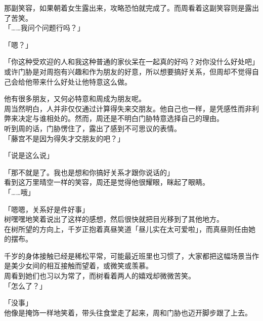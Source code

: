 那副笑容，如果朝着女生露出来，攻略恐怕就完成了。而周看着这副笑容则是露出了苦笑。\\

「……我问个问题行吗？」

「嗯？」

「你这种受欢迎的人和我这种普通的家伙呆在一起真的好吗？对你没什么好处吧」\\

或许门胁是对周抱有兴趣和作为朋友的好意，所以想要搞好关系，但周却不觉得自己会给他带来什么好处让他特意这么做。

他有很多朋友，又何必特意和周成为朋友呢。\\

周当然明白，人并非仅仅通过计算得失来交朋友。他自己也一样，是凭感性而非利弊来决定与谁相处的。然而，周还是不明白门胁特意选择自己的理由。\\

听到周的话，门胁愣住了，露出了感到不可思议的表情。\\

「藤宫不是因为得失才交朋友的吧？」

「说是这么说」

「那不就是了。我也是想和你搞好关系才跟你说话的」\\

看到这万里晴空一样的笑容，周还是觉得他很耀眼，眯起了眼睛。\\

「……哦」

「嗯嗯，关系好是件好事」\\

树嘿嘿地笑着说出了这样的感想，然后很快就把目光移到了其他地方。\\

在树所望的方向上，千岁正抱着真昼笑道「昼儿实在太可爱啦」，而真昼则任由她的摆布。

千岁的身体接触已经是稀松平常，可能最近班里也习惯了，大家都把这幅场景当作是美少女间的相互接触而望着，或微笑或羡慕。\\

周看到她们也习以为常了，而树看着两人的嬉戏却微微苦笑。\\

「怎么了？」

「没事」\\

他像是掩饰一样地笑着，带头往食堂走了起来，周和门胁也迈开脚步跟了上去。\\

\vspace{2\baselineskip}


